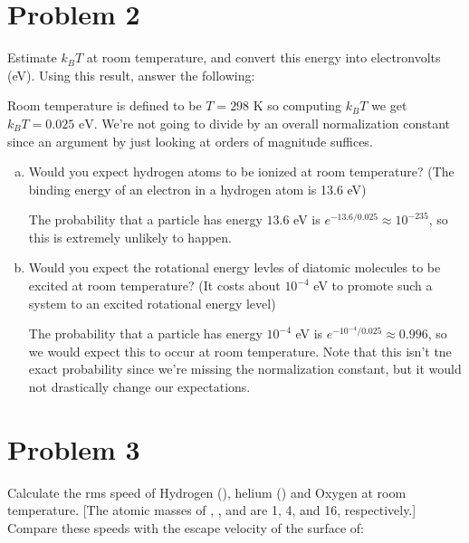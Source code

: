 \documentclass{article}
\begin{document}
    \section*{Problem 2}


    Estimate $k_BT$ at room temperature, and convert this energy into electronvolts (eV). Using this result, answer the following:
    
    \begin{solution}
        Room temperature is defined to be $T = 298 \text{ K}$ so computing $k_BT$ we get $k_BT = 0.025 \text{ eV}$. We're not going to divide by an overall normalization constant since an argument by just looking at orders of magnitude suffices.
    \end{solution}
    \begin{enumerate}[(a)]
        \item Would you expect hydrogen atoms to be ionized at room temperature? (The binding energy of an electron in a hydrogen atom is 13.6 eV)
        
        \begin{solution}
            The probability that a particle has energy $13.6$ eV is $e^{-13.6/0.025} \approx 10^{-235}$, so this is extremely unlikely to happen.
        \end{solution}
        \item Would you expect the rotational energy levles of diatomic molecules to be excited at room temperature? (It costs about $10^{-4}$ eV to promote such a system to an excited rotational energy level)
        

        \begin{solution}
            The probability that a particle has energy $10^{-4}$ eV is $e^{-10^{-4}/0.025} \approx 0.996$, so we would expect this to occur at room temperature. Note that this isn't tne exact probability since we're missing the normalization constant, but it would not drastically change our expectations.
        \end{solution}
    \end{enumerate}

    \pagebreak

    \section*{Problem 3}

    Calculate the rms speed of Hydrogen (), helium () and Oxygen  at room temperature. [The atomic masses of , , and  are 1, 4, and 16, respectively.] Compare these speeds with the escape velocity of the surface of:
\end{document}
